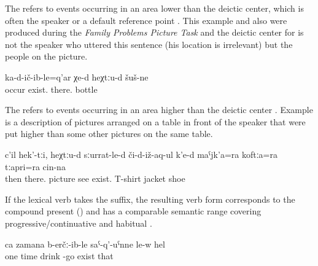 The   refers to events occurring in an area lower than the deictic center, which is often the speaker or a default reference point . This example and also  were produced during the \textit{Family Problems Picture Task} \citep{SanRoqueEtAl2012} and the deictic center for  is not the speaker who uttered this sentence (his location is irrelevant) but the people on the picture. 
%
\begin{exe}
	\ex	\label{ex:There bottles have fallen down periphrastic}
	\gll	ka-d-ič-ib-le=q'ar	χe-d	heχtːu-d	šuš-ne\\
		occur	exist.	there.	bottle\\
	\glt	{}
\end{exe}

The   refers to events occurring in an area higher than the deictic center . Example  is a description of pictures arranged on a table in front of the speaker that were put higher than some other pictures on the same table.  

\begin{exe}
	\ex	\label{ex:Then there one the picture it shows there are his T-shirt, jacket, and shoes.}
	\gll	c'il	hek'-tːi,	heχtːu-d	sːurrat-le-d	či-d-iž-aq-ul	k'e-d	maˁjk'a=ra	koftːa=ra		tːapri=ra	cin-na\\
		then		there.	picture	see	exist.	T-shirt\tsc{=add}	jacket		shoe	\\
	\glt	{}
\end{exe}

If the lexical verb takes the  suffix, the resulting verb form corresponds to the compound present () and has a comparable semantic range covering progressive\slash continuative  and habitual .
%
\begin{exe}
	\ex	\label{ex:One time he comes home drunk}
	\gll	ca	zamana	b-erčː-ib-le	saˁ-q'-uˁnne	le-w	hel\\
		one	time	drink	-go	exist	that\\
	\glt	{}
\end{exe}



